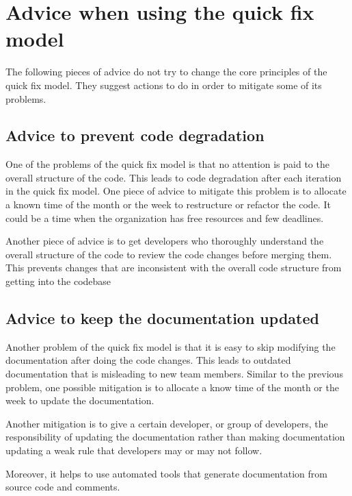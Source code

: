 \documentclass[11pt,a4paper]{article}
\begin{document}
\section{Advice when using the quick fix model}
The following pieces of advice do not try to change the core principles of the quick fix model.
They suggest actions to do in order to mitigate some of its problems.

\subsection{Advice to prevent code degradation}
One of the problems of the quick fix model is that no attention is paid to the overall structure of the code.
This leads to code degradation after each iteration in the quick fix model.
One piece of advice to mitigate this problem is to
allocate a known time of the month or the week to restructure or refactor the code.
It could be a time when the organization has free resources and few deadlines.

Another piece of advice is to get developers who thoroughly understand
the overall structure of the code to review the code changes before merging them.
This prevents changes that are inconsistent with the overall code structure from getting into the codebase

\subsection{Advice to keep the documentation updated}
Another problem of the quick fix model is that it is easy to skip modifying the documentation
after doing the code changes.
This leads to outdated documentation that is misleading to new team members.
Similar to the previous problem, one possible mitigation is to
allocate a know time of the month or the week to update the documentation.

Another mitigation is to give a certain developer, or group of developers, the responsibility of updating the
documentation rather than making documentation updating a weak rule that developers may or may not follow.

Moreover, it helps to use automated tools that generate documentation from source code and comments.
\end{document}
